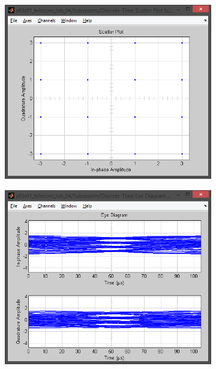 \documentclass[
	a4paper,
	oneside,
	BCOR = 10mm,
	DIV = 12,
	12pt,
	headings = normal,
]{scrartcl}
\begin{document}
\begin{figure}[!htbp]
\begin{subfigure}{\textwidth / 3}
						\caption{}
						\label{subfig:rolloff-0p2-signal-trajectory-in}
					\end{subfigure}%
					\begin{subfigure}{\textwidth / 3}
						\centering
						\includegraphics[height = 7\baselineskip]{../01-solution/rolloff-0p2-scatter-plot-in.png}
						\caption{}
						\label{subfig:rolloff-0p2-scatter-plot-in}
					\end{subfigure}
					\begin{subfigure}{\textwidth / 3}
						\centering
						\includegraphics[height = 7\baselineskip]{../01-solution/rolloff-0p2-eye-diag-out.png}

\end{subfigure}
\end{figure}
\end{document}
